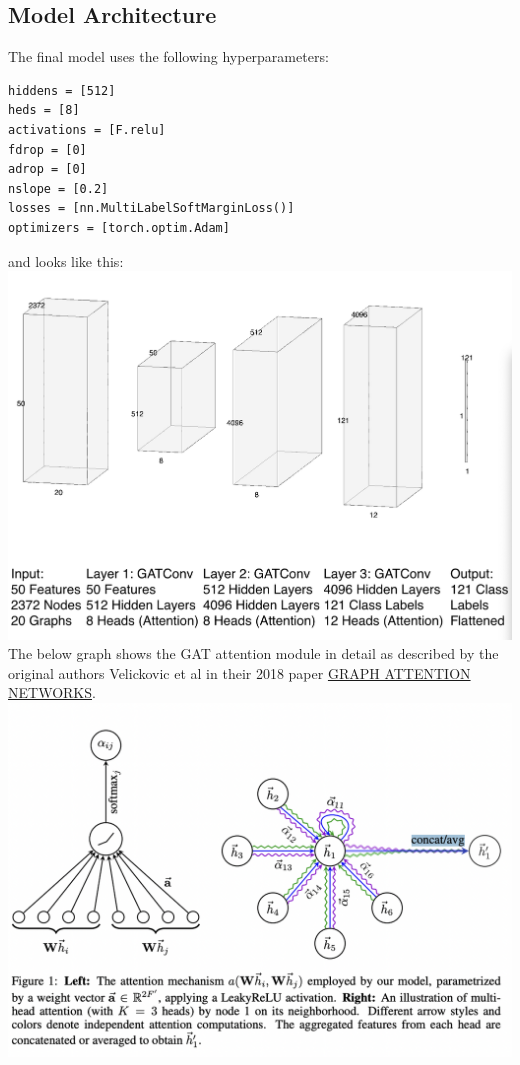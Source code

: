 \documentclass[13pt,english]{article}
\begin{document}
\subsection{Model Architecture}
The final model uses the following hyperparameters:
\begin{verbatim} 
hiddens = [512]
heds = [8] 
activations = [F.relu]
fdrop = [0]
adrop = [0]
nslope = [0.2]
losses = [nn.MultiLabelSoftMarginLoss()]
optimizers = [torch.optim.Adam]
\end{verbatim}
and looks like this: \\
\includegraphics[width=\textwidth]{architecture.png} \\
The below graph shows the GAT attention module in detail as described by the original authors Velickovic et al in their 2018 paper \href{https://arxiv.org/pdf/1710.10903.pdf}{GRAPH ATTENTION NETWORKS}. \\
\includegraphics[width=\textwidth]{attention.png}
\end{document}
